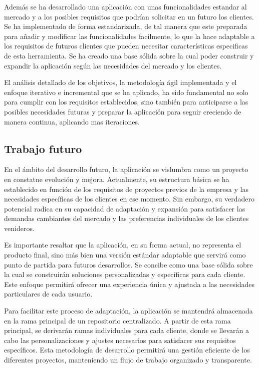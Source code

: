 \documentclass[12pt]{article}
\begin{document}
Además se ha desarrollado una aplicación con unas funcionalidades estandar al mercado y a los posibles requisitos que podrían solicitar en un futuro
los clientes. Se ha implementado de forma estandarizada, de tal manera que este preparada para añadir y modificar las funcionalidades facilmente, lo que la hace
adaptable a los requisitos de futuros clientes que pueden necesitar características especificas de esta herramienta.
Se ha creado una base sólida sobre la cual poder construir y expandir la aplicación según las necesidades del mercado y los clientes.

El análisis detallado de los objetivos, la metodología ágil implementada y el enfoque iterativo e incremental que se ha aplicado,
ha sido fundamental no solo para cumplir con los requisitos establecidos, sino también para anticiparse a las posibles necesidades futuras y
preparar la aplicación para seguir creciendo de manera continua, aplicando mas iteraciones.

\subsection{Trabajo futuro}
En el ámbito del desarrollo futuro, la aplicación se vislumbra como un proyecto en constatne evolución y mejora. Actualmente, su estructura básica se ha 
establecido en función de los requisitos de proyectos previos de la empresa y las necesidades específicas de los clientes en ese momento. Sin embargo, su 
verdadero potencial radica en su capacidad de adaptación y expansión para satisfacer las demandas cambiantes del mercado y las preferencias individuales de los 
clientes venideros.

Es importante resaltar que la aplicación, en su forma actual, no representa el producto final, sino más bien una versión estándar adaptable que servirá como punto
de partida para futuros desarrollos. Se concibe como una base sólida sobre la cual se construirán soluciones personalizadas y específicas para cada cliente. Este enfoque
permitirá ofrecer una experiencia única y ajustada a las necesidades particulares de cada usuario.

Para facilitar este proceso de adaptación, la aplicación se mantendrá almacenada en la rama principal de un repositorio centralizado. A partir de esta rama principal,
se derivarán ramas individuales para cada cliente, donde se llevarán a cabo las personalizaciones y ajustes necesarios para satisfacer sus requisitos específicos.
Esta metodología de desarrollo permitirá una gestión eficiente de los diferentes proyectos, manteniendo un flujo de trabajo organizado y transparente.
\end{document}
